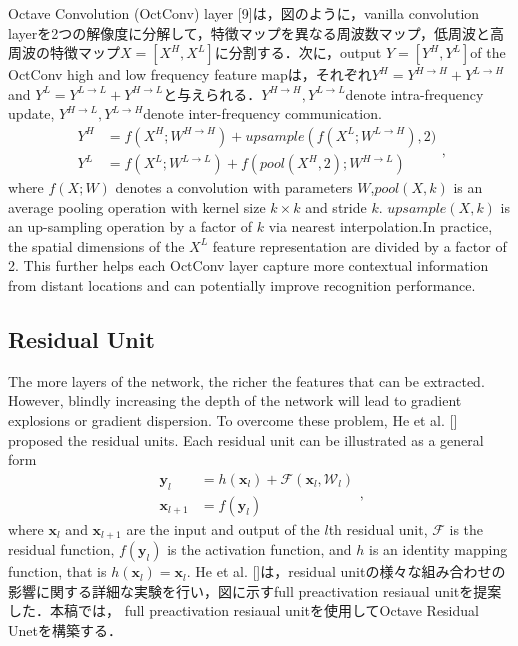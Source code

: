 \documentclass{article}
\begin{document}
Octave Convolution (OctConv) layer [9]は，図のように，vanilla convolution layerを2つの解像度に分解して，特徴マップを異なる周波数マップ，低周波と高周波の特徴マップ$X = [{X^H,X^L}]$に分割する．次に，output $Y=[{Y^H,Y^L}]$of the OctConv high and low frequency feature mapは，それぞれ$Y^H=Y^{H\rightarrow H}+Y^{L\rightarrow H}$ and $Y^L=Y^{L\rightarrow L}+Y^{H\rightarrow L}$と与えられる．$Y^{H\rightarrow H},Y^{L\rightarrow L}$denote intra-frequency update, $Y^{H\rightarrow L},Y^{L\rightarrow H}$denote inter-frequency communication.
\begin{equation}
\begin{aligned} Y^{H} &=f\left(X^{H} ; W^{H \rightarrow H}\right)+ {upsample}\left(f\left(X^{L} ; W^{L \rightarrow H}\right),2)\right.\\ Y^{L} &=f\left(X^{L} ; W^{L \rightarrow L}\right)+f\left(pool\left(X^{H}, 2\right) ; W^{H \rightarrow L}\right) \end{aligned},
\end{equation}
where $f(X; W)$ denotes a convolution with parameters $W$,$ pool(X, k)$ is an average pooling operation with kernel size $k \times k$ and stride $k$. $upsample(X, k)$ is an up-sampling operation by a factor of $k$ via nearest interpolation.In practice,  the spatial dimensions of the $X^L$ feature representation are divided by a factor of 2. This further helps each OctConv layer capture more contextual information from distant locations and can potentially improve recognition performance.
\subsection{Residual Unit}
The more layers of the network, the richer the features that can be extracted. However, blindly increasing the depth of the network will lead to gradient explosions or gradient dispersion. To overcome these problem, He et al. [] proposed the residual units. Each residual unit can be illustrated as a general form  
\begin{equation}
\begin{aligned} \mathbf{y}_{l} &=h\left(\mathbf{x}_{l}\right)+\mathcal{F}\left(\mathbf{x}_{l}, \mathcal{W}_{l}\right)\\ \mathbf{x}_{l+1} &=f\left(\mathbf{y}_{l}\right) \end{aligned},
\end{equation}
where $\mathbf{x}_{l}$ and $\mathbf{x}_{l+1}$ are the input and output of the ${l}$th residual unit, $\mathcal{F}$ is the residual function, $f\left(\mathbf{y}_{l}\right)$ is the activation function, and $h$ is an identity mapping function, that is $h\left(\mathbf{x}_{l}\right)=\mathbf{x}_{l}$. He et al. []は，residual unitの様々な組み合わせの影響に関する詳細な実験を行い，図に示すfull preactivation resiaual unitを提案した．本稿では， full preactivation resiaual unitを使用してOctave Residual Unetを構築する．
\end{document}
